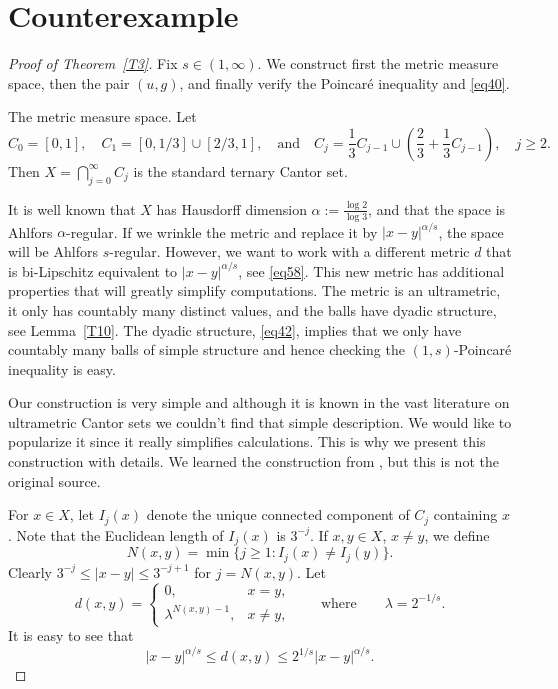 \documentclass[12pt,leqno]{amsart}
\theoremstyle{definition}
\numberwithin{theorem}{section} \numberwithin{equation}{section}
\begin{document}
\section{Counterexample}

\begin{proof}[Proof of Theorem~\ref{T3}]
Fix $s\in(1,\infty)$. We construct first the metric measure space, then the pair $(u,g)$, and finally verify the Poincar\'e inequality and \eqref{eq40}.

\noindent
{\sc The metric measure space.}
Let
\[
C_0=[0,1],
\quad
C_1=[0,1/3]\cup[2/3,1],
\quad 
\text{and}
\quad
C_j=\frac13 C_{j-1}\cup\left(\frac23+\frac13 C_{j-1}\right),\quad j\geq2.
\]
Then $X=\bigcap_{j=0}^\infty C_j$ is the standard ternary Cantor set.


It is well known that $X$ has Hausdorff dimension $\alpha:=\frac{\log 2}{\log 3}$, and that the space is Ahlfors $\alpha$-regular. If we wrinkle the metric and replace it by $|x-y|^{\alpha/s}$, the space will be Ahlfors $s$-regular. However, we want to work with a different metric $d$ that is bi-Lipschitz equivalent to  $|x-y|^{\alpha/s}$, see \eqref{eq58}. This new metric has additional properties that will greatly simplify computations. 
The metric is an ultrametric, it only has countably many distinct values, and the balls have dyadic structure, see Lemma~\ref{T10}. The dyadic structure, \eqref{eq42}, implies that we only have countably many balls of simple structure and hence checking the $(1,s)$-Poincar\'e inequality is  easy.

Our construction is very simple and although it is known in the vast literature on ultrametric Cantor sets we couldn't find that simple description. 
We would like to popularize it since it really simplifies calculations. This is why we present this construction with details.
We learned the construction from  \cite[Theorem~6.16]{farsi}, but this is not the original source.

For $x\in X$, let $I_j(x)$ denote the unique connected component of $C_j$ containing $x$. Note that the Euclidean length of $I_j(x)$ is $3^{-j}$. If $x,y\in X$, $x\neq y$, we define
\[
 N(x,y)=\min\{j\geq1:I_j(x)\neq I_j(y)\}.
\]
Clearly $3^{-j}\leq |x-y|\leq 3^{-j+1}$ for $j=N(x,y)$. Let
\[
d(x,y)=
\begin{cases}
0,&x=y,\\
\lambda^{N(x,y)-1},&x\neq y,
\end{cases}
\qquad
\text{where}
\qquad
\lambda=2^{-1/s}.
\]
It is easy to see that
\begin{equation}
\label{eq58}
|x-y|^{\alpha/s}\leq d(x,y)\leq 2^{1/s}|x-y|^{\alpha/s}.
\end{equation}


\end{proof}
\end{document}
